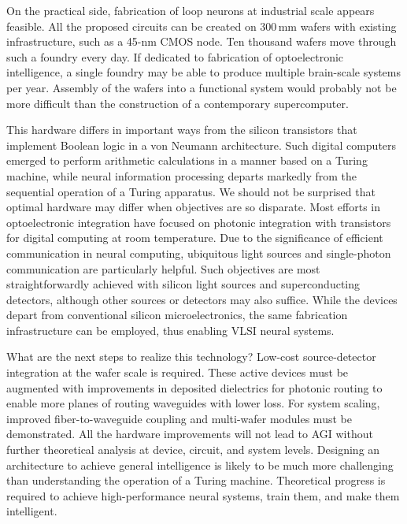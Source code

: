 \documentclass[twocolumn]{article}
\begin{document}
On the practical side, fabrication of loop neurons at industrial scale appears feasible. All the proposed circuits can be created on 300\,mm wafers with existing infrastructure, such as a 45-nm CMOS node. Ten thousand wafers move through such a foundry every day. If dedicated to fabrication of optoelectronic intelligence, a single foundry may be able to produce multiple brain-scale systems per year. Assembly of the wafers into a functional system would probably not be more difficult than the construction of a contemporary supercomputer.

This hardware differs in important ways from the silicon transistors that implement Boolean logic in a von Neumann architecture. Such digital computers emerged to perform arithmetic calculations in a manner based on a Turing machine, while neural information processing departs markedly from the sequential operation of a Turing apparatus. We should not be surprised that optimal hardware may differ when objectives are so disparate. Most efforts in optoelectronic integration have focused on photonic integration with transistors for digital computing at room temperature. Due to the significance of efficient communication in neural computing, ubiquitous light sources and single-photon communication are particularly helpful. Such objectives are most straightforwardly achieved with silicon light sources and superconducting detectors, although other sources or detectors may also suffice. While the devices depart from conventional silicon microelectronics, the same fabrication infrastructure can be employed, thus enabling VLSI neural systems. 

What are the next steps to realize this technology? Low-cost source-detector integration at the wafer scale is required. These active devices must be augmented with improvements in deposited dielectrics for photonic routing to enable more planes of routing waveguides with lower loss. For system scaling, improved fiber-to-waveguide coupling and multi-wafer modules must be demonstrated. All the hardware improvements will not lead to AGI without further theoretical analysis at device, circuit, and system levels. Designing an architecture to achieve general intelligence is likely to be much more challenging than understanding the operation of a Turing machine. Theoretical progress is required to achieve high-performance neural systems, train them, and make them intelligent.



\end{document}

